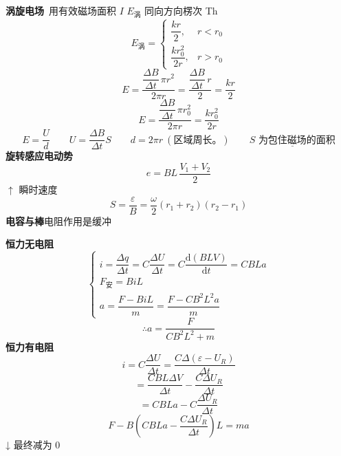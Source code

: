 \textbf{涡旋电场}\quad {}\ 用有效磁场面积 %
$I$ $E_{\text{涡}}$ 同向\quad 方向楞次 Th
\[ E_{\text{涡}}=\left\{\begin{array}{ll}\dfrac{kr}{2}, & r<r_0\\[2ex] \dfrac{kr_0^2}{2r}, & r>r_0\end{array}\right. \]
\[ E=\frac{\dfrac{\Delta B}{\Delta t}\,\pi r^2}{2\pi r}=\frac{\dfrac{\Delta B}{\Delta t}\,r}{2}=\frac{kr}{2} \]
\[ E=\frac{\dfrac{\Delta B}{\Delta t}\,\pi r_0^2}{2\pi r}=\frac{kr_0^2}{2r} \]
\[ E=\frac{U}{d}\qquad U=\frac{\Delta B}{\Delta t}S\qquad d=2\pi r\ (\text{区域周长。})\qquad \underline{S\text{ 为包住磁场的面积}} \]
\textbf{旋转感应电动势}
\[ e=BL\,\frac{V_1+V_2}{2} \]
$\uparrow$ 瞬时速度 %
\[ S=\frac{\varepsilon}{B}=\frac{\omega}{2}(r_1+r_2)(r_2-r_1) \] %
\textbf{电容与棒}\quad 电阻作用是缓冲

\textbf{恒力无电阻} %
\[ \left\{\begin{array}{l}
i=\dfrac{\Delta q}{\Delta t}=C\dfrac{\Delta U}{\Delta t}=C\dfrac{\mathrm{d}(BLV)}{\mathrm{d}t}=CBLa\\[2.5ex]
F_{\text{安}}=BiL\\[1ex]
a=\dfrac{F-BiL}{m}=\dfrac{F-CB^2L^2a}{m}
\end{array}\right. \]
\[ \therefore a=\frac{F}{CB^2L^2+m} \]
\textbf{恒力有电阻} %
\[ i=C\frac{\Delta U}{\Delta t}=\frac{C\Delta(\varepsilon-U_R)}{\Delta t} \]
\[ =\frac{CBL\Delta V}{\Delta t}-\frac{C\Delta U_R}{\Delta t} \]
\[ =CBLa-C\frac{\Delta U_R}{\Delta t} \]
\[ F-B\left(CBLa-\frac{C\Delta U_R}{\Delta t}\right)L=ma \]
↓ 最终减为 0 %


